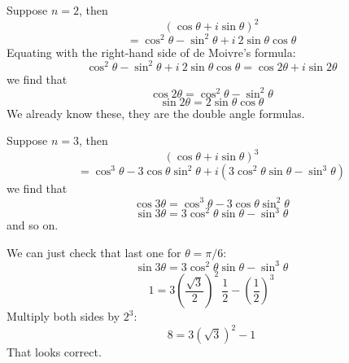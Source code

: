 \documentclass[11pt, oneside]{article}   	%
\begin{document}
Suppose $n=2$, then
\[ (\cos \theta + i \sin \theta)^2 \]
\[ = \cos^2 \theta - \sin^2 \theta + i\ 2 \sin \theta \cos \theta \]
Equating with the right-hand side of de Moivre's formula:
\[ \cos^2 \theta - \sin^2 \theta + i\ 2 \sin \theta \cos \theta = \cos 2 \theta + i \sin 2 \theta \]
we find that
\[ \cos 2 \theta = \cos^2 \theta - \sin^2 \theta \]
\[ \sin 2 \theta = 2 \sin \theta \cos \theta \]
We already know these, they are the double angle formulas.

Suppose $n=3$, then
\[ (\cos \theta + i \sin \theta)^3 \]
\[ = \cos^3 \theta - 3 \cos \theta \sin^2 \theta + i (3 \cos^2 \theta \sin \theta - \sin^3 \theta) \]
we find that
\[ \cos 3 \theta =\cos^3 \theta - 3 \cos \theta \sin^2 \theta \]
\[ \sin 3 \theta = 3 \cos^2 \theta \sin \theta - \sin^3 \theta \]
and so on.

We can just check that last one for $\theta = \pi/6$:
\[ \sin 3 \theta = 3 \cos^2 \theta \sin \theta - \sin^3 \theta \]
\[ 1 = 3 (\frac{\sqrt{3}}{2})^2 \ \frac{1}{2} - (\frac{1}{2})^3 \]
Multiply both sides by $2^3$:
\[ 8 = 3 (\sqrt{3})^2 - 1 \]
That looks correct.
\end{document}
